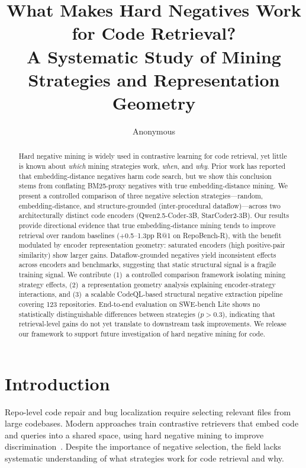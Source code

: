 \documentclass[11pt,a4paper]{article}
\title{What Makes Hard Negatives Work for Code Retrieval?\\A Systematic Study of Mining Strategies and Representation Geometry}
\author{Anonymous}
\begin{document}
\maketitle

\begin{abstract}
Hard negative mining is widely used in contrastive learning for code retrieval, yet little is known about \emph{which} mining strategies work, \emph{when}, and \emph{why}. Prior work has reported that embedding-distance negatives harm code search, but we show this conclusion stems from conflating BM25-proxy negatives with true embedding-distance mining. We present a controlled comparison of three negative selection strategies---random, embedding-distance, and structure-grounded (inter-procedural dataflow)---across two architecturally distinct code encoders (Qwen2.5-Coder-3B, StarCoder2-3B). Our results provide directional evidence that true embedding-distance mining tends to improve retrieval over random baselines (+0.5--1.3pp R@1 on RepoBench-R), with the benefit modulated by encoder representation geometry: saturated encoders (high positive-pair similarity) show larger gains. Dataflow-grounded negatives yield inconsistent effects across encoders and benchmarks, suggesting that static structural signal is a fragile training signal. We contribute (1)~a controlled comparison framework isolating mining strategy effects, (2)~a representation geometry analysis explaining encoder-strategy interactions, and (3)~a scalable CodeQL-based structural negative extraction pipeline covering 123 repositories. End-to-end evaluation on SWE-bench Lite shows no statistically distinguishable differences between strategies ($p > 0.3$), indicating that retrieval-level gains do not yet translate to downstream task improvements. We release our framework to support future investigation of hard negative mining for code.
\end{abstract}

\section{Introduction}
\label{sec:intro}

Repo-level code repair and bug localization require selecting relevant files from large codebases. Modern approaches train contrastive retrievers that embed code and queries into a shared space, using hard negative mining to improve discrimination~\cite{karpukhin2020dense,xiong2020approximate}. Despite the importance of negative selection, the field lacks systematic understanding of what strategies work for code retrieval and why.
\end{document}
